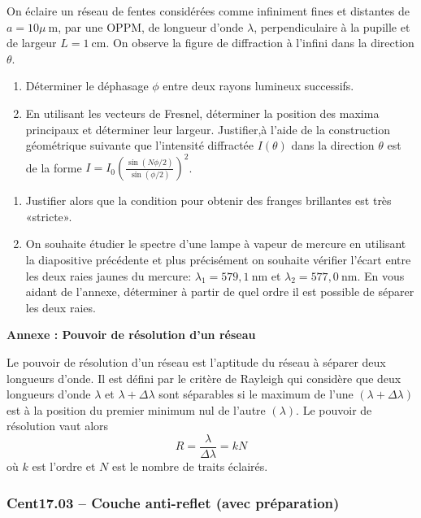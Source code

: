 On éclaire un réseau de fentes considérées comme infiniment fines et distantes de $a=10 \mu \mathrm{~m}$, par une OPPM, de longueur d'onde $\lambda$, perpendiculaire à la pupille et de largeur $L=1 \mathrm{~cm}$. On observe la figure de diffraction à l'infini dans la direction $\theta$.

\begin{enumerate}
\item Déterminer le déphasage $\phi$ entre deux rayons lumineux successifs.
\item En utilisant les vecteurs de Fresnel, déterminer la position des maxima principaux et déterminer leur largeur. Justifier,à l'aide de la construction géométrique suivante que l'intensité diffractée $I(\theta)$ dans la direction $\theta$ est de la forme $I=I_0\left(\frac{\sin (N \phi / 2)}{\sin (\phi / 2)}\right)^2$.
\end{enumerate}

\begin{center}
\end{center}

\begin{enumerate}[resume]
\item Justifier alors que la condition pour obtenir des franges brillantes est très «stricte».
\item On souhaite étudier le spectre d'une lampe à vapeur de mercure en utilisant la diapositive précédente et plus précisément on souhaite vérifier l'écart entre les deux raies jaunes du mercure: $\lambda_1=579,1 \mathrm{~nm}$ et $\lambda_2=577,0 \mathrm{~nm}$. En vous aidant de l'annexe, déterminer à partir de quel ordre il est possible de séparer les deux raies.

\end{enumerate}

\textbf{Annexe : Pouvoir de résolution d'un réseau}

Le pouvoir de résolution d'un réseau est l'aptitude du réseau à séparer deux longueurs d'onde. Il est défini par le critère de Rayleigh qui considère que deux longueurs d'onde $\lambda$ et $\lambda+\Delta \lambda$ sont séparables si le maximum de l'une $(\lambda+\Delta \lambda)$ est à la position du premier minimum nul de l'autre $(\lambda)$. Le pouvoir de résolution vaut alors
$$
R=\frac{\lambda}{\Delta \lambda}=k N
$$
où $k$ est l'ordre et $N$ est le nombre de traits éclairés.

\newpage
\subsubsection*{Cent17.03 -- Couche anti-reflet (avec préparation)  \corrige}

